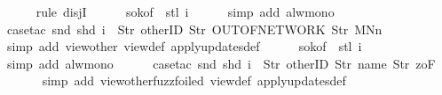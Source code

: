 \begin{isabellebody}
\ \ \ \ \isamarkupfalse%
\ {\isacharparenleft}rule\ disjI{}{\isacharparenright}\isanewline
\ \ \ \ \isamarkupfalse%
\ s{}{\isacharunderscore}ok{\isacharbrackleft}of\ {\isachardoublequoteopen}{\isacharbrackleft}{\isacharbrackright}{\isachardoublequoteclose}\ {\isachardoublequoteopen}stl\ i{\isachardoublequoteclose}{\isacharbrackright}\isanewline
\ \ \ \ \isamarkupfalse%
\ {\isacharparenleft}simp\ add{\isacharcolon}\ alw{\isacharunderscore}mono{\isacharparenright}\isanewline
\ \ \ \ \isamarkupfalse%
\ {\isacharparenleft}case{\isacharunderscore}tac\ {\isachardoublequoteopen}{\isacharparenleft}snd\ {\isacharparenleft}shd\ i{\isacharparenright}{\isacharparenright}\ {\isacharequal}\ {\isacharbrackleft}Str\ {\isacharprime}{\isacharprime}otherID{\isacharprime}{\isacharprime}{\isacharcomma}\ Str\ {\isacharprime}{\isacharprime}OUT{\isacharunderscore}OF{\isacharunderscore}NETWORK{\isacharprime}{\isacharprime}{\isacharcomma}\ Str\ {\isacharprime}{\isacharprime}MNn{}{\isacharprime}{\isacharprime}{\isacharbrackright}{\isachardoublequoteclose}{\isacharparenright}\isanewline
\ \ \ \ \ \isamarkupfalse%
\ {\isacharparenleft}simp\ add{\isacharcolon}\ view{\isacharunderscore}other\ view{}{\isacharunderscore}def\ apply{\isacharunderscore}updates{\isacharunderscore}def{\isacharparenright}\isanewline
\ \ \ \ \isamarkupfalse%
\ s{}{\isacharunderscore}ok{\isacharbrackleft}of\ {\isachardoublequoteopen}{\isacharbrackleft}{\isacharbrackright}{\isachardoublequoteclose}\ {\isachardoublequoteopen}stl\ i{\isachardoublequoteclose}{\isacharbrackright}\isanewline
\ \ \ \ \isamarkupfalse%
\ {\isacharparenleft}simp\ add{\isacharcolon}\ alw{\isacharunderscore}mono{\isacharparenright}\isanewline
\ \ \ \ \isamarkupfalse%
\ {\isacharparenleft}case{\isacharunderscore}tac\ {\isachardoublequoteopen}{\isacharparenleft}snd\ {\isacharparenleft}shd\ i{\isacharparenright}{\isacharparenright}\ {\isacharequal}\ {\isacharbrackleft}Str\ {\isacharprime}{\isacharprime}otherID{\isacharprime}{\isacharprime}{\isacharcomma}\ Str\ {\isacharprime}{\isacharprime}name{\isacharprime}{\isacharprime}{\isacharcomma}\ Str\ {\isacharprime}{\isacharprime}{}zoF{\isacharprime}{\isacharprime}{\isacharbrackright}{\isachardoublequoteclose}{\isacharparenright}\isanewline
\ \ \ \ \ \isamarkupfalse%
\ {\isacharparenleft}simp\ add{\isacharcolon}\ view{\isacharunderscore}other{\isacharunderscore}fuzz{\isacharunderscore}foiled\ view{}{\isacharunderscore}def\ apply{\isacharunderscore}updates{\isacharunderscore}def{\isacharparenright}\isanewline

\end{isabellebody}
